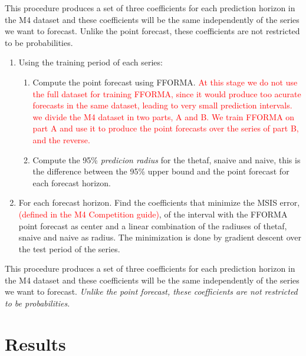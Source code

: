 \documentclass[11pt,a4paper,]{article}
\providecommand{\tightlist}{%
  \setlength{\itemsep}{0pt}\setlength{\parskip}{0pt}}
\theoremstyle{definition}
\theoremstyle{definition}
\theoremstyle{definition}
\theoremstyle{remark}
\begin{document}
This procedure produces a set of three coefficients for each prediction
horizon in the M4 dataset and these coefficients will be the same
independently of the series we want to forecast. Unlike the point
forecast, these coefficients are not restricted to be probabilities.

\begin{enumerate}
\def\labelenumi{\arabic{enumi}.}
\tightlist
\item
  Using the training period of each series:

  \begin{enumerate}
  \def\labelenumii{\alph{enumii}.}
  \tightlist
  \item
    Compute the point forecast using FFORMA.
    \textcolor{red}{At this stage we do not use the full dataset for training FFORMA, since it would produce too acurate forecasts in the same dataset, leading to very small prediction intervals. we divide the M4 dataset in two parts, A and B. We train FFORMA on part A and use it to produce the point forecasts over the series of part B, and the reverse.}
  \item
    Compute the 95\% \emph{predicion radius} for the thetaf, snaive and
    naive, this is the difference between the 95\% upper bound and the
    point forecast for each forecast horizon.
  \end{enumerate}
\item
  For each forecast horizon. Find the coefficients that minimize the
  MSIS error, \textcolor{red}{(defined in the M4 Competition guide)}, of
  the interval with the FFORMA point forecast as center and a linear
  combination of the radiuses of thetaf, snaive and naive as radius. The
  minimization is done by gradient descent over the test period of the
  series.
\end{enumerate}

This procedure produces a set of three coefficients for each prediction
horizon in the M4 dataset and these coefficients will be the same
independently of the series we want to forecast. \emph{Unlike the point
forecast, these coefficients are not restricted to be probabilities.}

\section{Results}\label{results}
\end{document}
